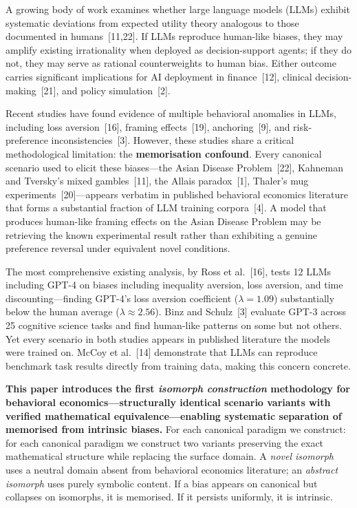 \documentclass{article}
\begin{document}
A growing body of work examines whether large language models (LLMs)
exhibit systematic deviations from expected utility theory analogous to
those documented in humans~[11,22]. If LLMs reproduce human-like biases,
they may amplify existing irrationality when deployed as decision-support
agents; if they do not, they may serve as rational counterweights to human
bias. Either outcome carries significant implications for AI deployment in
finance~[12], clinical decision-making~[21], and policy simulation~[2].

Recent studies have found evidence of multiple behavioral anomalies in LLMs,
including loss aversion~[16], framing effects~[19], anchoring~[9], and
risk-preference inconsistencies~[3]. However, these studies share a critical
methodological limitation: the \textbf{memorisation confound}. Every canonical
scenario used to elicit these biases---the Asian Disease Problem~[22],
Kahneman and Tversky's mixed gambles~[11], the Allais paradox~[1], Thaler's
mug experiments~[20]---appears verbatim in published behavioral economics
literature that forms a substantial fraction of LLM training corpora~[4].
A model that produces human-like framing effects on the Asian Disease Problem
may be retrieving the known experimental result rather than exhibiting a
genuine preference reversal under equivalent novel conditions.

The most comprehensive existing analysis, by Ross et al.~[16], tests 12 LLMs
including GPT-4 on biases including inequality aversion, loss aversion, and
time discounting---finding GPT-4's loss aversion coefficient ($\lambda = 1.09$)
substantially below the human average ($\lambda \approx 2.56$). Binz and
Schulz~[3] evaluate GPT-3 across 25 cognitive science tasks and find
human-like patterns on some but not others. Yet every scenario in both
studies appears in published literature the models were trained on. McCoy
et al.~[14] demonstrate that LLMs can reproduce benchmark task results
directly from training data, making this concern concrete.

\textbf{This paper introduces the first \emph{isomorph construction}
methodology for behavioral economics---structurally identical scenario variants
with verified mathematical equivalence---enabling systematic separation of
memorised from intrinsic biases.} For each canonical paradigm we construct:
for each canonical paradigm we construct two variants preserving the exact
mathematical structure while replacing the surface domain. A \emph{novel
isomorph} uses a neutral domain absent from behavioral economics literature;
an \emph{abstract isomorph} uses purely symbolic content. If a bias appears
on canonical but collapses on isomorphs, it is memorised. If it persists
uniformly, it is intrinsic.
\end{document}

